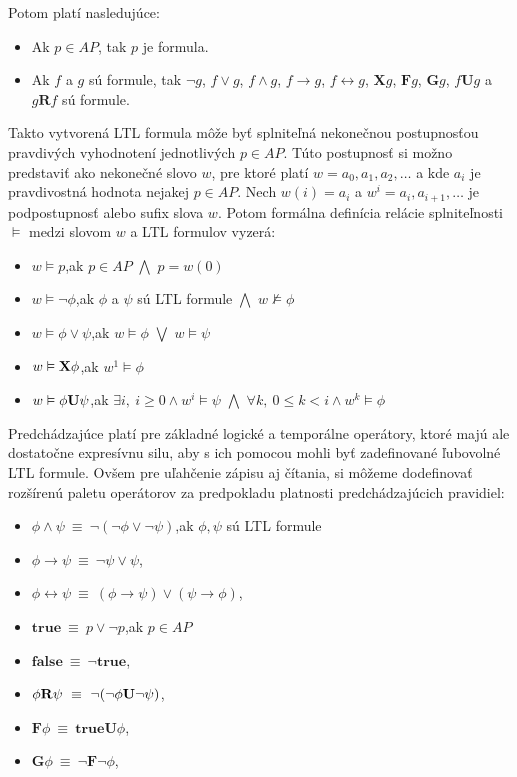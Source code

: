 \documentclass[11pt,final,oneside]{fithesis}
\begin{document}
Potom plat\'i nasleduj\'uce:
\begin{itemize}
\item Ak $p \in AP$, tak $p$ je formula.
\item Ak $f$ a $g$ s\'u formule, tak $\neg g$, $f \lor g$, $f \wedge g$, $f \rightarrow g$, $f \leftrightarrow g$, $\mathbf{X} g$, $\mathbf{F} g$, 
$\mathbf{G} g$, $f \mathbf{U} g$ a $g \mathbf{R} f$ s\'u formule.
\end{itemize}
Takto vytvoren\'a LTL formula m\^ o\v ze by\v t splnite\v ln\'a nekone\v cnou postupnos\v tou pravdiv\'ych vyhodnoten\'i jednotliv\'ych $p \in AP$. 
T\'uto postupnos\v t si mo\v zno predstavi\v t ako nekone\v cn\'e slovo $w$, pre ktor\'e plat\'i $w = a_0,a_1,a_2,\dots{}$ a kde $a_i$ je pravdivostn\'a hodnota
nejakej $p \in AP$. Nech $w(i) = a_i$ a $w^i = a_i,a_{i+1},\dots{}$ je podpostupnos\v t alebo sufix slova $w$. Potom form\'alna defin\'icia rel\'acie splnite\v lnosti
$\vDash$ medzi slovom $w$ a LTL formulov vyzer\'a:
\begin{itemize}
\item $w \vDash p$,\hfil ak $p \in AP$ $\bigwedge$ $p = w(0)$
\item $w \vDash \neg\phi$,\hfil ak $\phi$ a $\psi$ s\'u LTL formule $\bigwedge$ $w \nvDash \phi$
\item $w \vDash \phi \vee \psi$,\hfil ak $w \vDash \phi$ $\bigvee$ $w \vDash \psi$
\item $w \vDash {\bf X}\phi$,\hfil ak $w^1 \vDash \phi$
\item $w \vDash \phi {\bf U} \psi$,\hfil ak $\exists i,\ i \geq 0 \wedge w^i \vDash \psi$ $\bigwedge$ $\forall k,\ 0 \leq k < i \wedge w^k \vDash \phi$
\end{itemize}
Predch\'adzaj\'uce plat\'i pre z\'akladn\'e logick\'e a tempor\'alne oper\'atory, ktor\'e maj\'u ale dostato\v cne expres\'ivnu silu, aby s ich pomocou
mohli by\v t zadefinovan\'e \v lubovoln\'e LTL formule. Ov\v sem pre u\v lah\v cenie z\'apisu aj \v c\'itania, si m\^ o\v zeme dodefinova\v t roz\v s\'iren\'u
paletu oper\'atorov za predpokladu platnosti predch\'adzaj\'ucich pravidiel:
\begin{itemize}
\item $\phi \wedge \psi \ \equiv \ \neg(\neg \phi \vee \neg \psi)$,\hfil ak $\phi, \psi$ s\'u LTL formule
\item $\phi \rightarrow \psi \ \equiv \ \neg \psi \vee \psi$,
\item $\phi \leftrightarrow \psi \ \equiv \ (\phi \rightarrow \psi) \vee (\psi \rightarrow \phi)$,
\item $\mathbf{true} \ \equiv \ p \vee \neg p$,\hfil ak $p \in AP$
\item $\mathbf{false} \ \equiv \ \neg\mathbf{true}$,
\item $\phi {\bf R} \psi \ \equiv \ \neg(\neg\phi{\bf U}\neg\psi)$,
\item $\mathbf{F} \phi \ \equiv \ \mathbf{true U} \phi$,
\item $\mathbf{G} \phi \ \equiv \ \neg \mathbf{F} \neg \phi$,
\end{itemize}
\end{document}
